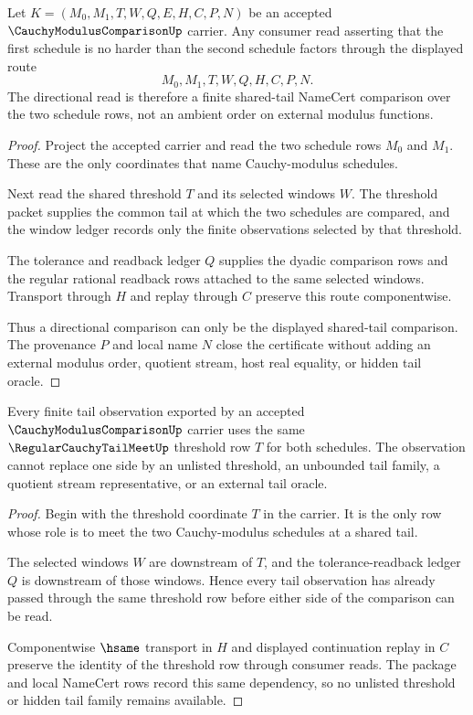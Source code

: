 \begin{theorem}
\label{thm:cauchy-modulus-comparison-directional-monotonicity}
Let $K=(M_0,M_1,T,W,Q,E,H,C,P,N)$ be an accepted $\CauchyModulusComparisonUp$ carrier. Any consumer read asserting that the first schedule is no harder than the second schedule factors through the displayed route
$$
M_0,M_1,T,W,Q,H,C,P,N.
$$
The directional read is therefore a finite shared-tail NameCert comparison over the two schedule rows, not an ambient order on external modulus functions.
\end{theorem}
\begin{proof}
Project the accepted carrier and read the two schedule rows $M_0$ and $M_1$. These are the only coordinates that name Cauchy-modulus schedules.

Next read the shared threshold $T$ and its selected windows $W$. The threshold packet supplies the common tail at which the two schedules are compared, and the window ledger records only the finite observations selected by that threshold.

The tolerance and readback ledger $Q$ supplies the dyadic comparison rows and the regular rational readback rows attached to the same selected windows. Transport through $H$ and replay through $C$ preserve this route componentwise.

Thus a directional comparison can only be the displayed shared-tail comparison. The provenance $P$ and local name $N$ close the certificate without adding an external modulus order, quotient stream, host real equality, or hidden tail oracle.
\end{proof}

\begin{theorem}
\label{thm:cauchy-modulus-comparison-shared-tail-exactness}
Every finite tail observation exported by an accepted $\CauchyModulusComparisonUp$ carrier uses the same $\RegularCauchyTailMeetUp$ threshold row $T$ for both schedules. The observation cannot replace one side by an unlisted threshold, an unbounded tail family, a quotient stream representative, or an external tail oracle.
\end{theorem}
\begin{proof}
Begin with the threshold coordinate $T$ in the carrier. It is the only row whose role is to meet the two Cauchy-modulus schedules at a shared tail.

The selected windows $W$ are downstream of $T$, and the tolerance-readback ledger $Q$ is downstream of those windows. Hence every tail observation has already passed through the same threshold row before either side of the comparison can be read.

Componentwise $\hsame$ transport in $H$ and displayed continuation replay in $C$ preserve the identity of the threshold row through consumer reads. The package and local NameCert rows record this same dependency, so no unlisted threshold or hidden tail family remains available.
\end{proof}

